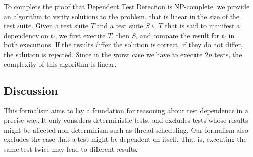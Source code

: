 To complete the proof that Dependent Test Detection is NP-complete, we
provide an algorithm to verify solutions to the problem, that is
linear in the size of the test suite.
Given a test suite $T$ and a test suite $S \subseteq T$ that is said
to manifest a dependency on $t_i$, we first execute $T$, then $S$, and
compare the result for $t_i$ in both executions. 
If the results differ the solution is correct, if they do not differ,
the solution is rejected.
Since in the worst case we have to execute $2n$ tests, the complexity
of this algorithm is linear. 



\subsection{Discussion}
\label{sec:formaldiscussion}

This formalism aims to lay a foundation for reasoning about
test dependence in a precise way. It only considers
deterministic tests, and excludes tests whose results
might be affected non-determinism such as thread scheduling.
Our formalism also excludes the case that a test might
be dependent on itself. That is, executing the same
test twice may lead to different results.






